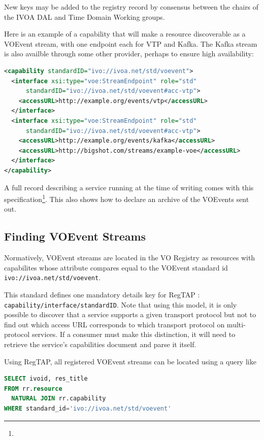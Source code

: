 \documentclass[11pt,a4paper]{ivoa}
\begin{document}
New keys may be added to the registry record by consensus between the
chairs of the IVOA DAL and Time Domain Working groups.

Here is an example of a capability that will make a resource
discoverable as a VOEvent stream, with one endpoint each for VTP and
Kafka.  The Kafka stream is also availble through some other
provider, perhaps to ensure high availability:

\begin{lstlisting}[language=XML]
<capability standardID="ivo://ivoa.net/std/voevent">
  <interface xsi:type="voe:StreamEndpoint" role="std"
      standardID="ivo://ivoa.net/std/voevent#acc-vtp">
    <accessURL>http://example.org/events/vtp</accessURL>
  </interface>
  <interface xsi:type="voe:StreamEndpoint" role="std"
      standardID="ivo://ivoa.net/std/voevent#acc-vtp">
    <accessURL>http://example.org/events/kafka</accessURL>
    <accessURL>http://bigshot.com/streams/example-voe</accessURL>
  </interface>
</capability>
\end{lstlisting}

A full record describing a service running at the time of writing
comes with this
specification\footnote{}.  This also
shows how to declare an archive of the VOEvents sent out.

\subsection{Finding VOEvent Streams}

Normatively, VOEvent streams are located in the VO Registry as resources
with capabilites whose  attribute compares equal to
the VOEvent standard id \nolinkurl{ivo://ivoa.net/std/voevent}.

This standard defines one mandatory details key for RegTAP
\citep{2019ivoa.spec.1011D}: \verb|capability/interface/standardID|.
Note that using this model, it is only possible to discover that a
service supports a given transport protocol but not to find out which
access URL corresponds to which transport protocol on multi-protocol
services.  If a consumer must make this distinction, it will need to
retrieve the service's capabilities document and parse it itself.

Using RegTAP, all registered VOEvent streams
can be located using a query like

\begin{lstlisting}[language=SQL]
SELECT ivoid, res_title
FROM rr.resource
  NATURAL JOIN rr.capability
WHERE standard_id='ivo://ivoa.net/std/voevent'
\end{lstlisting}
\end{document}
